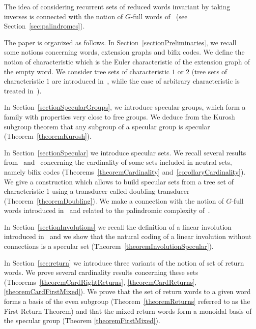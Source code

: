 \documentclass[preprint,12pt]{elsarticle}
\numberwithin{theorem}{section}
\numberwithin{equation}{section}
\numberwithin{figure}{section}
\numberwithin{table}{section}
\begin{document}
The idea of considering recurrent sets of reduced words invariant by taking inverses is connected with the notion of $G$-full words of~\cite{PelantovaStarosta2014} (see Section~\ref{sec:palindromes}).

The paper is organized as follows.
In Section~\ref{sectionPreliminaries}, we recall some notions concerning words, extension graphs and bifix codes.
We define the notion of characteristic which is the Euler characteristic of the extension graph of the empty word.
We consider tree sets of characteristic $1$ or $2$ (tree sets of characteristic $1$ are introduced in~\cite{BertheDeFeliceDolceLeroyPerrinReutenauerRindone2013a}, while the case of arbitrary characteristic is treated in~\cite{DolcePerrin2016}).


In Section~\ref{sectionSpecularGroups}, we introduce specular groups, which form a family with properties very close to free groups.
We deduce from the Kurosh subgroup theorem that any subgroup of a specular group is specular (Theorem~\ref{theoremKurosh}).

In Section~\ref{sectionSpecular} we introduce specular sets.
We recall several results from~\cite{DolcePerrin2015} and~\cite{DolcePerrin2016} concerning the cardinality of some sets included in neutral sets, namely bifix codes (Theorems~\ref{theoremCardinality} and~\ref{corollaryCardinality}).
We give a construction which allows to build specular sets from a tree set of characteristic $1$ using a transducer called doubling transducer (Theorem~\ref{theoremDoubling}).
We make a connection with the notion of $G$-full words introduced in~\cite{PelantovaStarosta2014} and related to the palindromic complexity of~\cite{DroubayJustinPirillo2001}.

In Section~\ref{sectionInvolutions} we recall the definition of a linear involution introduced in~\cite{DanthonyNogueira1988} and we show that the natural coding of a linear involution without connections is a specular set (Theorem~\ref{theoremInvolutionSpecular}).

In Section~\ref{sec:return} we introduce three variants of the notion of set of return words.
We prove several cardinality results concerning these sets (Theorems~\ref{theoremCardRightReturns}, \ref{theoremCardReturns}, \ref{theoremCardFirstMixed}).
We prove that the set of return words to a given word forms a basis of the even subgroup (Theorem~\ref{theoremReturns} referred to as the First Return Theorem) and that the mixed return words form a monoidal basis of the specular group (Theorem \ref{theoremFirstMixed}).
\end{document}
